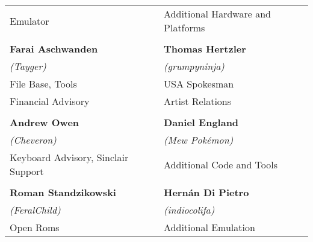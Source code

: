 \begin{tabular}{ll}
Emulator                                & Additional Hardware and Platforms \\
& \\
{\large\bf Farai Aschwanden}            & {\large\bf Thomas Hertzler} \\
 \textit{(Tayger)}                      & \textit{(grumpyninja)} \\
File Base, Tools                        & USA Spokesman \\
Financial Advisory                      & Artist Relations \\
& \\
{\large\bf Andrew Owen}                 & {\large\bf Daniel England} \\
 \textit{(Cheveron)}                    & \textit{(Mew Pokémon)} \\
Keyboard Advisory, Sinclair Support     & Additional Code and Tools \\
& \\
{\large\bf Roman Standzikowski}         & {\large\bf Hernán Di Pietro} \\
 \textit{(FeralChild)}                  & \textit{(indiocolifa)} \\
Open Roms                               & Additional Emulation \\
\end{tabular}

